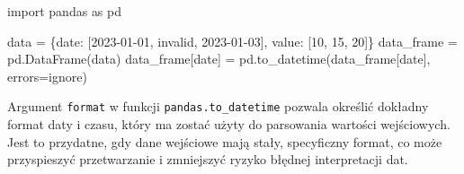 \documentclass[
  polish,
  letterpaper,
  DIV=11,
  numbers=noendperiod]{scrreprt}
\newenvironment{Shaded}{\begin{snugshade}}{\end{snugshade}}
\newcommand{\DecValTok}[1]{\textcolor[rgb]{0.68,0.00,0.00}{#1}}
\newcommand{\ImportTok}[1]{\textcolor[rgb]{0.00,0.46,0.62}{#1}}
\newcommand{\NormalTok}[1]{\textcolor[rgb]{0.00,0.23,0.31}{#1}}
\newcommand{\OperatorTok}[1]{\textcolor[rgb]{0.37,0.37,0.37}{#1}}
\newcommand{\StringTok}[1]{\textcolor[rgb]{0.13,0.47,0.30}{#1}}
\begin{document}
\begin{Shaded}
\begin{Highlighting}[]
\ImportTok{import}\NormalTok{ pandas }\ImportTok{as}\NormalTok{ pd}

\NormalTok{data }\OperatorTok{=}\NormalTok{ \{}\StringTok{\textquotesingle{}date\textquotesingle{}}\NormalTok{: [}\StringTok{\textquotesingle{}2023{-}01{-}01\textquotesingle{}}\NormalTok{, }\StringTok{\textquotesingle{}invalid\textquotesingle{}}\NormalTok{, }\StringTok{\textquotesingle{}2023{-}01{-}03\textquotesingle{}}\NormalTok{], }\StringTok{\textquotesingle{}value\textquotesingle{}}\NormalTok{: [}\DecValTok{10}\NormalTok{, }\DecValTok{15}\NormalTok{, }\DecValTok{20}\NormalTok{]\}}
\NormalTok{data\_frame }\OperatorTok{=}\NormalTok{ pd.DataFrame(data)}
\NormalTok{data\_frame[}\StringTok{\textquotesingle{}date\textquotesingle{}}\NormalTok{] }\OperatorTok{=}\NormalTok{ pd.to\_datetime(data\_frame[}\StringTok{\textquotesingle{}date\textquotesingle{}}\NormalTok{], errors}\OperatorTok{=}\StringTok{\textquotesingle{}ignore\textquotesingle{}}\NormalTok{)}
\end{Highlighting}
\end{Shaded}

Argument \texttt{format} w funkcji \texttt{pandas.to\_datetime} pozwala
określić dokładny format daty i czasu, który ma zostać użyty do
parsowania wartości wejściowych. Jest to przydatne, gdy dane wejściowe
mają stały, specyficzny format, co może przyspieszyć przetwarzanie i
zmniejszyć ryzyko błędnej interpretacji dat.
\end{document}
